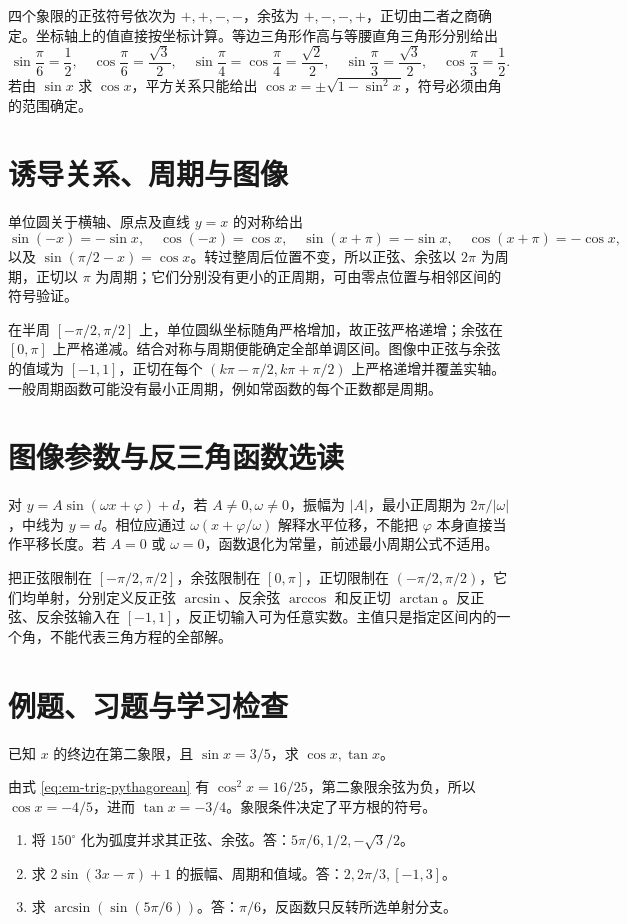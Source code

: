 四个象限的正弦符号依次为 $+,+,-,-$，余弦为 $+,-,-,+$，正切由二者之商确定。坐标轴上的值直接按坐标计算。等边三角形作高与等腰直角三角形分别给出
\[
 \sin\frac\pi6=\frac12,\quad\cos\frac\pi6=\frac{\sqrt3}2,\quad
 \sin\frac\pi4=\cos\frac\pi4=\frac{\sqrt2}2,\quad
 \sin\frac\pi3=\frac{\sqrt3}2,\quad\cos\frac\pi3=\frac12.
\]
若由 $\sin x$ 求 $\cos x$，平方关系只能给出 $\cos x=\pm\sqrt{1-\sin^2x}$，符号必须由角的范围确定。

\section{诱导关系、周期与图像}
单位圆关于横轴、原点及直线 $y=x$ 的对称给出
\[
 \sin(-x)=-\sin x,\quad \cos(-x)=\cos x,\quad
 \sin(x+\pi)=-\sin x,\quad\cos(x+\pi)=-\cos x,
\]
以及 $\sin(\pi/2-x)=\cos x$。转过整周后位置不变，所以正弦、余弦以 $2\pi$ 为周期，正切以 $\pi$ 为周期；它们分别没有更小的正周期，可由零点位置与相邻区间的符号验证。

在半周 $[-\pi/2,\pi/2]$ 上，单位圆纵坐标随角严格增加，故正弦严格递增；余弦在 $[0,\pi]$ 上严格递减。结合对称与周期便能确定全部单调区间。图像中正弦与余弦的值域为 $[-1,1]$，正切在每个 $(k\pi-\pi/2,k\pi+\pi/2)$ 上严格递增并覆盖实轴。一般周期函数可能没有最小正周期，例如常函数的每个正数都是周期。

\section{图像参数与反三角函数选读}
对 $y=A\sin(\omega x+\varphi)+d$，若 $A\ne0,\omega\ne0$，振幅为 $|A|$，最小正周期为 $2\pi/|\omega|$，中线为 $y=d$。相位应通过 $\omega(x+\varphi/\omega)$ 解释水平位移，不能把 $\varphi$ 本身直接当作平移长度。若 $A=0$ 或 $\omega=0$，函数退化为常量，前述最小周期公式不适用。

把正弦限制在 $[-\pi/2,\pi/2]$，余弦限制在 $[0,\pi]$，正切限制在 $(-\pi/2,\pi/2)$，它们均单射，分别定义反正弦 $\arcsin$、反余弦 $\arccos$ 和反正切 $\arctan$。反正弦、反余弦输入在 $[-1,1]$，反正切输入可为任意实数。主值只是指定区间内的一个角，不能代表三角方程的全部解。

\section{例题、习题与学习检查}
\begin{example}
已知 $x$ 的终边在第二象限，且 $\sin x=3/5$，求 $\cos x,\tan x$。
\end{example}
\begin{solve}
由式 \eqref{eq:em-trig-pythagorean} 有 $\cos^2x=16/25$，第二象限余弦为负，所以 $\cos x=-4/5$，进而 $\tan x=-3/4$。象限条件决定了平方根的符号。
\end{solve}
\begin{enumerate}
\item 将 $150^\circ$ 化为弧度并求其正弦、余弦。答：$5\pi/6,1/2,-\sqrt3/2$。
\item 求 $2\sin(3x-\pi)+1$ 的振幅、周期和值域。答：$2,2\pi/3,[-1,3]$。
\item 求 $\arcsin(\sin(5\pi/6))$。答：$\pi/6$，反函数只反转所选单射分支。
\end{enumerate}

